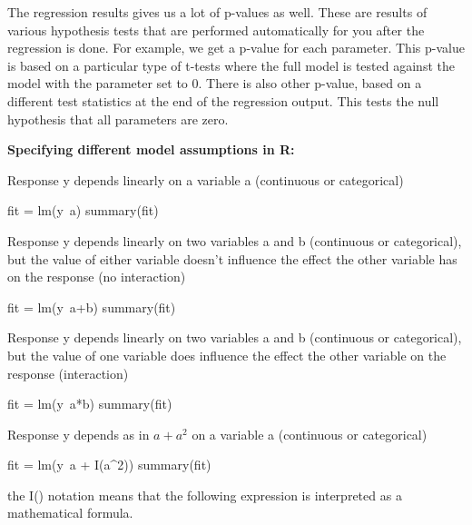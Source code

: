\documentclass[a4paper,twoside]{tufte-book}\usepackage[]{graphicx}\usepackage[]{color}
\begin{document}
The regression results gives us a lot of p-values as well. These are results of various hypothesis tests that are performed automatically for you after the regression is done. For example, we get a p-value for each parameter. This p-value is based on a particular type of t-tests where the full model is tested against the model with the parameter set to 0. There is also other p-value, based on a different test statistics at the end of the regression output. This tests the null hypothesis that all parameters are zero.  


\vspace{1cm}
\begin{fullwidth}
\begin{mdframed}
    
\textbf{Specifying different model assumptions in R:} 

Response y depends linearly on a variable a (continuous or categorical)

\begin{Schunk}
\begin{Sinput}
fit = lm(y~a)
summary(fit)
\end{Sinput}
\end{Schunk}

Response y depends linearly on two variables a and b (continuous or categorical), but the value of either variable doesn't influence the effect the other variable has on the response (no interaction)

\begin{Schunk}
\begin{Sinput}
fit = lm(y~a+b)
summary(fit)
\end{Sinput}
\end{Schunk}

Response y depends linearly on two variables a and b (continuous or categorical), but the value of one variable does influence the effect the other variable on the response (interaction)

\begin{Schunk}
\begin{Sinput}
fit = lm(y~a*b)
summary(fit)
\end{Sinput}
\end{Schunk}

Response y depends as in $a + a^2$ on a variable a (continuous or categorical)

\begin{Schunk}
\begin{Sinput}
fit = lm(y~a + I(a^2))
summary(fit)
\end{Sinput}
\end{Schunk}

the I() notation means that the following expression is interpreted as a mathematical formula. 

\end{mdframed}
\end{fullwidth}
\end{document}
